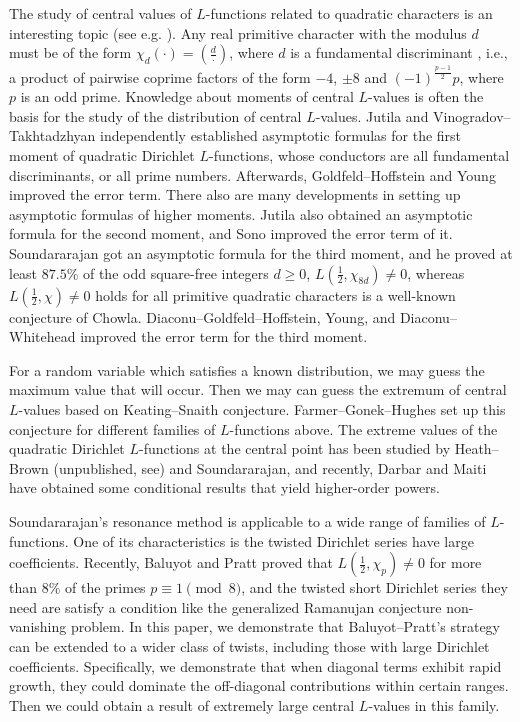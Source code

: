 \documentclass[12pt,reqno]{amsart}
\numberwithin{equation}{section}
\theoremstyle{plain}
\theoremstyle{definition}
\theoremstyle{remark}
\begin{document}
The study of central values of $L$-functions related to quadratic characters is an interesting topic (see e.g. \cite{BP22,DGH03,DW21,GZ23,GH85,HS22,HH22a,
HH22b,HH22c,Ju81,RS15,Sh22,Sono20,So00,
So08,So21,SY10,Yo09,Yo13}).
Any real primitive character with the modulus $d$ must be of the form $\chi_d(\cdot)=(\frac{d}{\cdot})$, where $d$ is a fundamental discriminant \cite[Theorem 9.13]{MV07}, i.e., a product of pairwise coprime factors of the form $-4$, $\pm 8$ and $(-1)^{\frac{p-1}{2}}p$, where $p$ is an odd prime.
Knowledge about moments of central $L$-values is often the basis for the study of the distribution of central $L$-values.
Jutila\cite{Ju81} and Vinogradov--Takhtadzhyan\cite{VT81} independently established asymptotic formulas for the first moment of quadratic Dirichlet $L$-functions, whose conductors are all fundamental discriminants, or all prime numbers.
Afterwards, Goldfeld--Hoffstein\cite{GH85} and Young\cite{Yo09} improved the error term.
There also are many developments in setting up asymptotic formulas of higher moments.
Jutila\cite{Ju81} also obtained an asymptotic formula for the second moment, and Sono\cite{Sono20} improved the error term of it.
Soundararajan\cite{So00} got an asymptotic formula for the third moment, and he proved at least $87.5\%$ of the odd square-free integers $d\geq 0$, $L(\frac{1}{2},\chi_{8d})\neq 0$, whereas $L(\frac{1}{2},\chi)\neq 0$ holds for all primitive quadratic characters is a well-known conjecture of Chowla\cite{Ch65}.
Diaconu--Goldfeld--Hoffstein\cite{DGH03}, Young\cite{Yo13}, and Diaconu--Whitehead\cite{DW21} improved the error term for the third moment.

For a random variable which satisfies a known distribution, we may guess the maximum value that will occur.
Then we may can guess the extremum of central $L$-values based on Keating--Snaith conjecture\cite{KS00b}.
Farmer--Gonek--Hughes\cite{FGH07} set up this conjecture for different families of $L$-functions above.
The extreme values of the quadratic Dirichlet $L$-functions at the central point has been studied by Heath--Brown (unpublished, see\cite{HL99}) and Soundararajan\cite{So08}, and recently, Darbar and Maiti\cite{DM24,DM25} have obtained some conditional results that yield higher-order powers.

Soundararajan's resonance method is applicable to a wide range of families of $L$-functions.
One of its characteristics is the twisted Dirichlet series have large coefficients.
Recently, Baluyot and Pratt\cite{BP22} proved that $L(\frac{1}{2},\chi_{p})\neq 0$ for more than $8\%$ of the primes $p\equiv 1\pmod 8$, and the twisted short Dirichlet series they need are satisfy a condition like the generalized Ramanujan conjecture  non-vanishing problem.
In this paper, we demonstrate that Baluyot--Pratt's strategy can be extended to a wider class of twists, including those with large Dirichlet coefficients. Specifically, we demonstrate that when diagonal terms exhibit rapid growth, they could dominate the off-diagonal contributions within certain ranges.
Then we could obtain a result of extremely large central $L$-values in this family.
\end{document}
